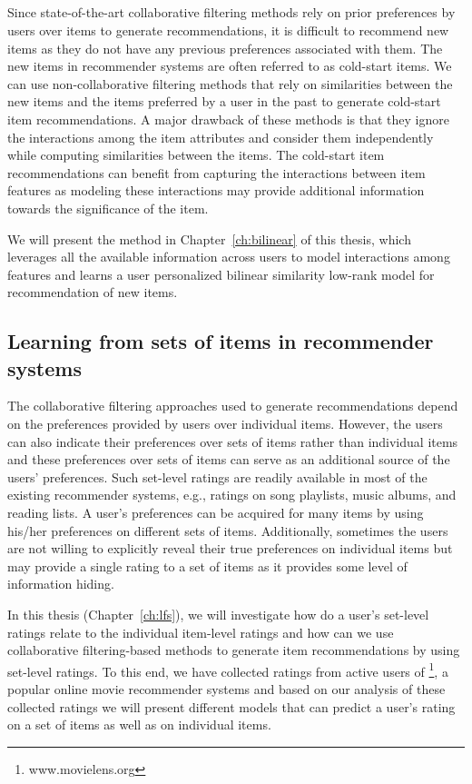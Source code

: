 \subsection{\CFEXP}
Since state-of-the-art collaborative filtering methods rely on prior preferences by users over items to generate recommendations, it is difficult to recommend new items as they do not have any previous preferences associated with them. The new items in recommender systems are often referred to as cold-start items. We can use non-collaborative filtering methods that rely on similarities between the new items and the items preferred by a user in the past to generate cold-start item recommendations. A major drawback of these methods is that they ignore the interactions among the item attributes and consider them independently while computing similarities between the items. The cold-start item recommendations can benefit from capturing the interactions between item features as modeling these interactions may provide additional information towards the significance of the item. 

We will present the method \CFEXPB in Chapter~\ref{ch:bilinear} of this thesis, which leverages all the available information across users to model interactions among features and learns a user personalized bilinear similarity low-rank model for \TOPN recommendation of new items.


\subsection{Learning from sets of items in recommender systems}

The collaborative filtering approaches used to generate recommendations depend
on the preferences provided by users over individual items. However, the users
can also indicate their preferences over sets of items rather than individual
items and these preferences over sets of items can serve as an additional source
of the users' preferences.  Such set-level ratings are readily available in most
of the existing recommender systems, e.g., ratings on song playlists, music albums,
and reading lists. A user's preferences can be acquired for many items by using
his/her preferences on different sets of items. Additionally, sometimes the users
are not willing to explicitly reveal their true preferences on individual items
but may provide a single rating to a set of items as it provides some level of
information hiding. 


In this thesis (Chapter~\ref{ch:lfs}), we will investigate how do a user's set-level ratings relate to the individual item-level ratings and how can we use collaborative filtering-based methods to generate item recommendations by using set-level ratings. To this end, we have collected ratings from active users of \ML\footnote{www.movielens.org}, a popular online movie recommender systems and based on our analysis of these collected ratings we will present different models that can predict a user's rating on a set of items as well as on individual items.

